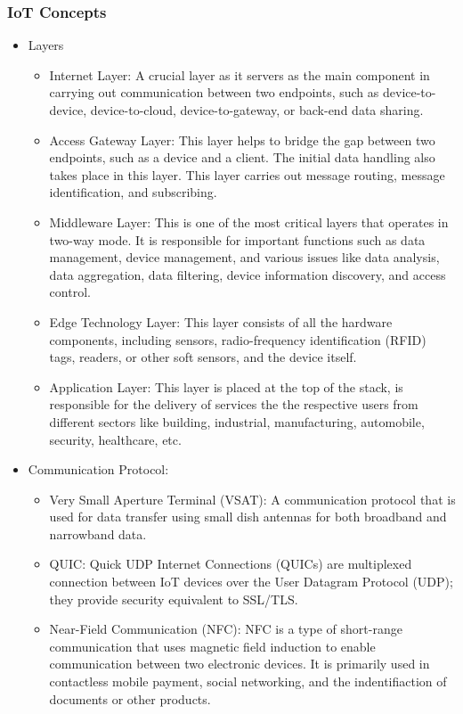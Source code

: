\subsubsection{IoT Concepts}
\begin{itemize}
    \item Layers
    \begin{itemize}
        \item Internet Layer: A crucial layer as it servers as the main component in carrying out communication between two endpoints, such as device-to-device, device-to-cloud, device-to-gateway, or back-end data sharing.
        \item Access Gateway Layer: This layer helps to bridge the gap between two endpoints, such as a device and a client. The initial data handling also takes place in this layer. This layer carries out message routing, message identification, and subscribing.
        \item Middleware Layer: This is one of the most critical layers that operates in two-way mode. It is responsible for important functions such as data management, device management, and various issues like data analysis, data aggregation, data filtering, device information discovery, and access control.
        \item Edge Technology Layer: This layer consists of all the hardware components, including sensors, radio-frequency identification (RFID) tags, readers, or other soft sensors, and the device itself.
        \item Application Layer: This layer is placed at the top of the stack, is responsible for the delivery of services the the respective users from different sectors like building, industrial, manufacturing, automobile, security, healthcare, etc.
    \end{itemize}
    \item Communication Protocol:
    \begin{itemize}
        \item Very Small Aperture Terminal (VSAT): A communication protocol that is used for data transfer using small dish antennas for both broadband and narrowband data.
        \item QUIC: Quick UDP Internet Connections (QUICs) are multiplexed connection between IoT devices over the User Datagram Protocol (UDP); they provide security equivalent to SSL/TLS.
        \item Near-Field Communication (NFC): NFC is a type of short-range communication that uses magnetic field induction to enable communication between two electronic devices. It is primarily used in contactless mobile payment, social networking, and the indentifiaction of documents or other products.

\end{itemize}
\end{itemize}
